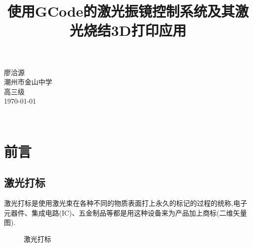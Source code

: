 \documentclass[a4paper,12pt,onecolumn,twoside]{article}
\title{使用GCode的激光振镜控制系统及其激光烧结3D打印应用}
\date{}
\begin{document}
\maketitle
\vspace{5in}
\begin{flushright}
\large{
	廖洽源\\
	潮州市金山中学\\
	高三级\\
	\today
}
\end{flushright}

\thispagestyle{empty} 　　　%
\tableofcontents
\newpage
{} %

\twocolumn
\section{前言}
\subsection{激光打标}
激光打标是使用激光束在各种不同的物质表面打上永久的标记的过程的统称,电子元器件、集成电路(IC)、五金制品等都是用这种设备来为产品加上商标(二维矢量图).
\begin{figure}[htbp]
\centering
{}
\caption{激光打标}
\end{figure}
\end{document}
